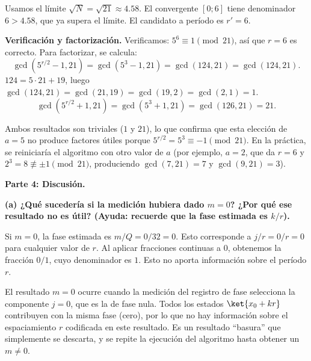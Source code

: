 Usamos el límite $\sqrt{N} = \sqrt{21} \approx 4.58$. El convergente $[0;6]$ tiene denominador $6 > 4.58$, que ya supera el límite. El candidato a período es $r' = 6$.

\textbf{Verificación y factorización.} Verificamos: $5^6 \equiv 1 \pmod{21}$, así que $r = 6$ es correcto. Para factorizar, se calcula:
$$
    \gcd(5^{r/2} - 1, 21) = \gcd(5^3 - 1, 21) = \gcd(124, 21) = \gcd(124, 21).
$$
$124 = 5 \cdot 21 + 19$, luego $\gcd(124, 21) = \gcd(21, 19) = \gcd(19, 2) = \gcd(2,1) = 1$.
$$
    \gcd(5^{r/2} + 1, 21) = \gcd(5^3 + 1, 21) = \gcd(126, 21) = 21.
$$

Ambos resultados son triviales ($1$ y $21$), lo que confirma que esta elección de $a = 5$ no produce factores útiles porque $5^{r/2} = 5^3 \equiv -1 \pmod{21}$. En la práctica, se reiniciaría el algoritmo con otro valor de $a$ (por ejemplo, $a = 2$, que da $r = 6$ y $2^3 = 8 \not\equiv \pm 1 \pmod{21}$, produciendo $\gcd(7, 21) = 7$ y $\gcd(9, 21) = 3$).

\vspace{0.5cm}

{\bfseries Parte 4: Discusión.}

{\bfseries (a) ¿Qué sucedería si la medición hubiera dado $m=0$? ¿Por qué ese resultado no es útil? (Ayuda: recuerde que la fase estimada es $k/r$).}

Si $m = 0$, la fase estimada es $m/Q = 0/32 = 0$. Esto corresponde a $j/r = 0/r = 0$ para cualquier valor de $r$. Al aplicar fracciones continuas a $0$, obtenemos la fracción $0/1$, cuyo denominador es $1$. Esto no aporta información sobre el período $r$.

El resultado $m = 0$ ocurre cuando la medición del registro de fase selecciona la componente $j = 0$, que es la de fase nula. Todos los estados $\ket{x_0 + kr}$ contribuyen con la misma fase (cero), por lo que no hay información sobre el espaciamiento $r$ codificada en este resultado. Es un resultado ``basura'' que simplemente se descarta, y se repite la ejecución del algoritmo hasta obtener un $m \neq 0$.

\vspace{1cm}